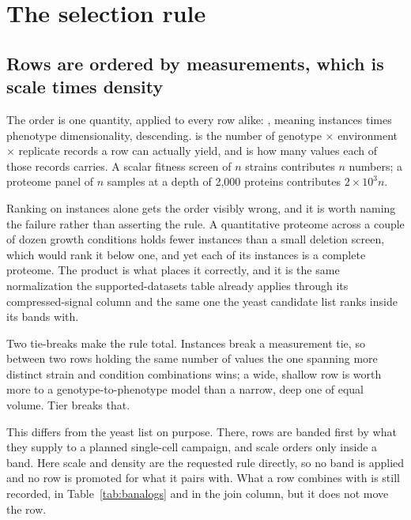 
\section{The selection rule}\label{sec:rule}

\subsection{Rows are ordered by measurements, which is scale times density}

The order is one quantity, applied to every row alike: , meaning
instances times phenotype dimensionality, descending.  is the number of
genotype $\times$ environment $\times$ replicate records a row can actually yield, and
 is how many values each of those records carries. A scalar fitness
screen of $n$ strains contributes $n$ numbers; a proteome panel of $n$ samples at a
depth of 2,000 proteins contributes $2\times10^{3}n$.

Ranking on instances alone gets the order visibly wrong, and it is worth naming the
failure rather than asserting the rule. A quantitative proteome across a couple of dozen
growth conditions holds fewer instances than a small deletion screen, which would rank it
below one, and yet each of its instances is a complete proteome. The product is what
places it correctly, and it is the same normalization the supported-datasets table
already applies through its compressed-signal column and the same one the yeast candidate
list ranks inside its bands with.

Two tie-breaks make the rule total. Instances break a measurement tie, so between two
rows holding the same number of values the one spanning more distinct strain and
condition combinations wins; a wide, shallow row is worth more to a
genotype-to-phenotype model than a narrow, deep one of equal volume. Tier breaks that.

This differs from the yeast list on purpose. There, rows are banded first by what they
supply to a planned single-cell campaign, and scale orders only inside a band. Here scale
and density are the requested rule directly, so no band is applied and no row is promoted
for what it pairs with. What a row combines with is still recorded, in
Table~\ref{tab:banalogs} and in the join column, but it does not move the row.

